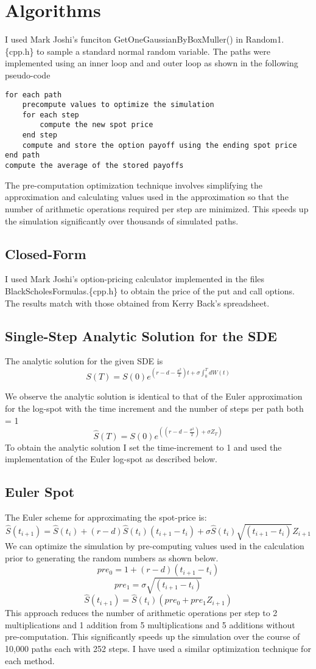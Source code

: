 \documentclass[letterpaper,twoside,11pt,fleqn]{article}
\begin{document}
\section*{Algorithms}
I used Mark Joshi's funciton GetOneGaussianByBoxMuller() in Random1.\{cpp.h\} to sample a standard normal random variable.  The paths were implemented using an inner loop and and outer loop as shown in the following pseudo-code
\begin{verbatim}
for each path
    precompute values to optimize the simulation
    for each step
        compute the new spot price
    end step
    compute and store the option payoff using the ending spot price
end path
compute the average of the stored payoffs
\end{verbatim}
The pre-computation optimization technique involves simplifying the approximation and calculating values used in the approximation so that the number of arithmetic operations required per step are minimized.  This speeds up the simulation significantly over thousands of simulated paths.

\subsection*{Closed-Form}
I used Mark Joshi's option-pricing calculator implemented in the files BlackScholesFormulas.\{cpp.h\} to obtain the price of the put and call options.  The results match with those obtained from Kerry Back's spreadsheet.

\subsection*{Single-Step Analytic Solution for the SDE}
The analytic solution for the given SDE is
\[
	S(T) = S(0)e^{(r - d - \frac{\sigma^2}{2})t + \sigma \int_0^TdW(t)}
\]

We observe the analytic solution is identical to that of the Euler approximation for the log-spot with the time increment and the number of steps per path both = 1
\[
	\hat{S}(T) = S(0) e^{ ( (r - d - \frac{\sigma^2}{2})  + \sigma  Z_{T} ) }
\]
To obtain the analytic solution I set the time-increment to 1 and used the implementation of the Euler log-spot as described below.

\subsection*{Euler Spot}
The Euler scheme for approximating the spot-price is:
\[
	\hat{S}(t_{i+1}) = \hat{S}(t_i) + (r - d)\hat{S}(t_i)(t_{i+1} - t_i) + \sigma \hat{S}(t_i) \sqrt{(t_{i+1} - t_i)} Z_{i+1}
\]
We can optimize the simulation by pre-computing values used in the calculation prior to generating the random numbers as shown below.
\[	pre_0 = 1 + (r - d) (t_{i+1} - t_i) \]
\[	pre_1 = \sigma \sqrt{(t_{i+1} - t_i)} \]
\[	\hat{S}(t_{i+1}) = \hat{S}(t_i)(pre_0 + pre_1 Z_{i+1} )  \]
This approach reduces the number of arithmetic operations per step to 2 multiplications and 1 addition from 5 multiplications and 5 additions without pre-computation. This significantly speeds up the simulation over the course of 10,000 paths each with 252 steps.  I have used a similar optimization technique for each method.
\end{document}
